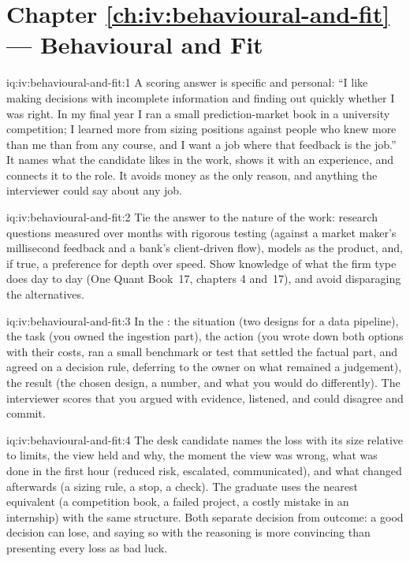 \section*{Chapter \ref{ch:iv:behavioural-and-fit} --- Behavioural and Fit}

\begin{solution}{iq:iv:behavioural-and-fit:1}
A scoring answer is specific and personal: ``I like making decisions with incomplete information and finding out quickly whether I
was right. In my final year I ran a small prediction-market book in a university competition; I learned more from sizing positions
against people who knew more than me than from any course, and I want a job where that feedback is the job.'' It names what the
candidate likes in the work, shows it with an experience, and connects it to the role. It avoids money as the only reason, and
anything the interviewer could say about any job.
\end{solution}

\begin{solution}{iq:iv:behavioural-and-fit:2}
Tie the answer to the nature of the work: research questions measured over months with rigorous testing (against a market maker's
millisecond feedback and a bank's client-driven flow), models as the product, and, if true, a preference for depth over speed. Show
knowledge of what the firm type does day to day (One Quant Book~17, chapters 4 and~17), and avoid disparaging the alternatives.
\end{solution}

\begin{solution}{iq:iv:behavioural-and-fit:3}
In the : the situation (two designs for a data pipeline), the task (you owned the ingestion part), the action (you
wrote down both options with their costs, ran a small benchmark or test that settled the factual part, and agreed on a decision
rule, deferring to the owner on what remained a judgement), the result (the chosen design, a number, and what you would do
differently). The interviewer scores that you argued with evidence, listened, and could disagree and commit.
\end{solution}

\begin{solution}{iq:iv:behavioural-and-fit:4}
The desk candidate names the loss with its size relative to limits, the view held and why, the moment the view was wrong, what was
done in the first hour (reduced risk, escalated, communicated), and what changed afterwards (a sizing rule, a stop, a check). The
graduate uses the nearest equivalent (a competition book, a failed project, a costly mistake in an internship) with the same
structure. Both separate decision from outcome: a good decision can lose, and saying so with the reasoning is more convincing than
presenting every loss as bad luck.
\end{solution}

